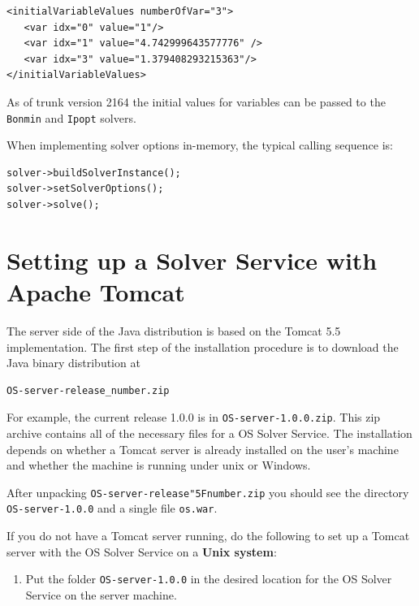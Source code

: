 \documentclass[11pt]{article}
\renewcommand{\_}{{\char"5F}}
\renewcommand{\{}{{\char"7B}}
\renewcommand{\}}{{\char"7D}}
\renewcommand{\^}{{\char"0D}}
\renewcommand{\'}{{\char"0D}}
\begin{document}
\begin{enumerate}[Step 1:]
\begin{verbatim}
<initialVariableValues numberOfVar="3">
   <var idx="0" value="1"/>
   <var idx="1" value="4.742999643577776" />
   <var idx="3" value="1.379408293215363"/>
</initialVariableValues>
\end{verbatim}

As of trunk version 2164 the initial values for variables can be passed
to the {\tt Bonmin} and {\tt Ipopt} solvers.


When implementing solver options in-memory, the typical calling sequence is:

\begin{verbatim}
solver->buildSolverInstance();
solver->setSolverOptions();
solver->solve();
\end{verbatim}






\section{Setting up a Solver Service with Apache Tomcat}\label{section:tomcat}

The server side of the Java distribution is based on the Tomcat 5.5 implementation. 
The first step of the installation procedure is to download the Java binary distribution at
\begin{verbatim}
OS-server-release_number.zip
\end{verbatim}

For example, the current release 1.0.0 is in {\tt OS-server-1.0.0.zip}.
This zip archive contains all of the necessary files for a OS Solver Service. The installation depends on
whether a Tomcat server is already installed on the user's machine and whether the machine is running
under unix or Windows.

After unpacking
{\tt OS-server-release\_number.zip} you should see the  directory {\tt OS-server-1.0.0} and a single file {\tt os.war}.

If you do not have a Tomcat server running, do the following to set up a  Tomcat server
with the OS Solver Service on a {\bf Unix system}:

\begin{enumerate}[Step 1.]
\item{}  Put the folder  {\tt OS-server-1.0.0}   in the desired location for the OS Solver Service on the server machine.


\end{enumerate}
\end{enumerate}
\end{document}
